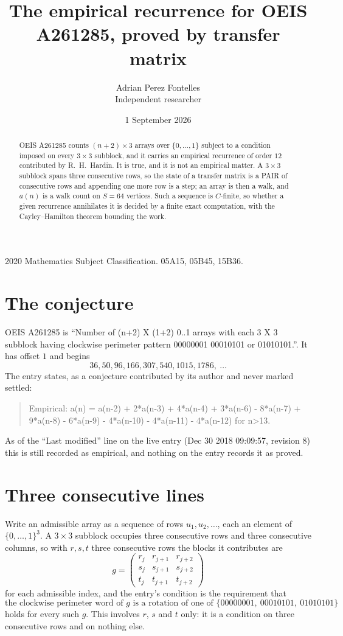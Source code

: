 \documentclass[11pt,a4paper]{article}
\title{The empirical recurrence for OEIS A261285, proved by transfer matrix}
\author{Adrian Perez Fontelles\\ \small Independent researcher}
\date{1 September 2026}
\theoremstyle{plain}
\theoremstyle{definition}
\begin{document}
\maketitle

\begin{abstract}
OEIS A261285 counts $(n+2)\times3$ arrays over $\{0,\dots,1\}$ subject to a condition imposed on
every $3\times3$ subblock, and it carries an empirical recurrence of order $12$
contributed by R.~H.~Hardin. It is true, and it is not an empirical matter. A $3\times3$
subblock spans three consecutive rows, so the state of a transfer matrix is a PAIR of
consecutive rows and appending one more row is a step; an array is then a walk, and
$a(n)$ is a walk count on $S=64$ vertices. Such a sequence is $C$-finite, so whether a given
recurrence annihilates it is decided by a finite exact computation, with the Cayley--Hamilton
theorem bounding the work.
\end{abstract}

\noindent\small 2020 Mathematics Subject Classification. 05A15, 05B45, 15B36.\normalsize

\section{The conjecture}

OEIS A261285 is ``Number of (n+2) X (1+2) 0..1 arrays with each 3 X 3 subblock having clockwise perimeter pattern 00000001 00010101 or 01010101.''. It has offset $1$ and begins
\[
36, 50, 96, 166, 307, 540, 1015, 1786,\ \dots
\]
The entry states, as a conjecture contributed by its author and never marked settled:
\begin{quote}
Empirical: a(n) = a(n-2) + 2*a(n-3) + 4*a(n-4) + 3*a(n-6) - 8*a(n-7) + 9*a(n-8) - 6*a(n-9) - 4*a(n-10) - 4*a(n-11) - 4*a(n-12) for n>13.
\end{quote}
As of the ``Last modified'' line on the live entry (Dec 30 2018 09:09:57, revision 8) this is still
recorded as empirical, and nothing on the entry records it as proved.

\section{Three consecutive lines}

Write an admissible array as a sequence of rows $u_1,u_2,\dots$, each an element of
$\{0,\dots,1\}^{3}$. A $3\times3$ subblock occupies three consecutive rows and
three consecutive columns, so with $r,s,t$ three consecutive rows the blocks it
contributes are
\[
g=\begin{pmatrix}r_j&r_{j+1}&r_{j+2}\\ s_j&s_{j+1}&s_{j+2}\\ t_j&t_{j+1}&t_{j+2}\end{pmatrix}
\]
for each admissible index, and the entry's condition is the requirement that
\[
\text{the clockwise perimeter word of }g\text{ is a rotation of one of }\{00000001,\ 00010101,\ 01010101\}
\]
holds for every such $g$. This involves $r$, $s$ and $t$ only: it is a condition on
three consecutive rows and on nothing else.
\end{document}
